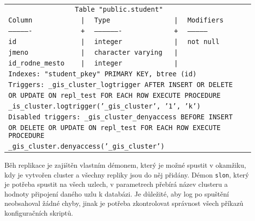 \begin{table}[H]
  \label{pgHba}
  \begin{center}
    \begin{tabular}{lllllll}
      \multicolumn{5}{c}{\texttt{Table "public.student"}} & & \\
      \texttt{Column}           & \texttt{|} & \texttt{Type}                & \texttt{|} & \texttt{Modifiers}      &    & \\
      \texttt{----------------} & \texttt{+} & \texttt{-------------------} & \texttt{+} & \texttt{--------------} &    & \\
      \texttt{id}               & \texttt{|} & \texttt{integer}             & \texttt{|} & \texttt{not null}       &    & \\
      \texttt{jmeno}            & \texttt{|} & \texttt{character varying}   & \texttt{|} &                         &    & \\
      \texttt{id\_rodne\_mesto} & \texttt{|} & \texttt{integer}             & \texttt{|} &                         & \\
      \multicolumn{7}{l}{\texttt{Indexes: "student\_pkey" PRIMARY KEY, btree (id)}} \\
      \multicolumn{7}{l}{\texttt{Triggers: \_gis\_cluster\_logtrigger AFTER INSERT OR DELETE}} \\
      \multicolumn{7}{l}{\texttt{OR UPDATE ON repl\_test FOR EACH ROW EXECUTE PROCEDURE}} \\
      \multicolumn{7}{l}{\texttt{\_is\_cluster.logtrigger('\_gis\_cluster', '1', 'k')}} \\
      \multicolumn{7}{l}{\texttt{Disabled triggers: \_gis\_cluster\_denyaccess BEFORE INSERT}} \\
      \multicolumn{7}{l}{\texttt{OR DELETE OR UPDATE ON repl\_test FOR EACH ROW EXECUTE PROCEDURE}} \\
      \multicolumn{7}{l}{\texttt{\_gis\_cluster.denyaccess('\_gis\_cluster')}} \\
    \end{tabular}
  \end{center}
\end{table}

Běh replikace je zajištěn vlastním démonem, který je možné spustit v okamžiku,
kdy je vytvořen cluster a všechny repliky jsou do něj přidány. Démon
\texttt{slon}, který je potřeba spustit na všech uzlech, v parametrech přebírá
název clusteru a hodnoty připojení daného uzlu k databázi. Je důležité, aby log
po spuštění neobsahoval žádné chyby, jinak je potřeba zkontrolovat správnost
všech příkazů konfiguračních skriptů.

